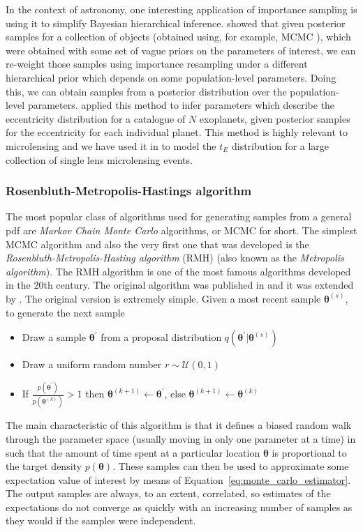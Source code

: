 \documentclass[12pt,dvipsnames]{report}
\renewcommand{\vec}[1]{\boldsymbol{\mathbf{#1}}}
\begin{document}
In the context of astronomy, one  interesting 
application of importance sampling is using it to simplify Bayesian hierarchical 
inference. \citet{2010ApJ...725.2166H} showed that given posterior samples for a 
collection of objects (obtained using, for example, MCMC ), which were obtained with some 
set of vague priors on the parameters of interest, we can re-weight those samples using 
importance resampling under a different hierarchical prior which depends on some 
population-level parameters. Doing this, we can obtain samples from a posterior 
distribution over the population-level parameters. 
\citet{2010ApJ...725.2166H} applied this method to infer parameters which 
describe the eccentricity  distribution for a catalogue of $N$ exoplanets, given 
posterior samples for the eccentricity for each individual planet. 
This method is highly relevant to microlensing and we have used it in \citet{golovich2022}
to model the $t_E$ distribution for a large collection of single lens microlensing 
events. 

\subsubsection{Rosenbluth-Metropolis-Hastings algorithm}
The most popular class of algorithms used for generating samples 
from a general pdf are 
\emph{Markov Chain Monte Carlo} algorithms, or MCMC for short. The simplest 
MCMC algorithm and also the very first one that was developed is the
\emph{Rosenbluth-Metropolis-Hasting algorithm} (RMH) (also known as the 
\emph{Metropolis algorithm}). The RMH algorithm is one of 
the most famous algorithms developed in the 20th century. The original algorithm was 
published in \citet{1953JChPh..21.1087M} and it was extended by 
\citet{1970Bimka..57...97H}. The original version is extremely simple. 
Given a most recent sample $\vec\theta^{(s)}$, to generate the next sample
\begin{itemize}
    \item Draw a sample $\vec{\theta}^\prime$ from a proposal distribution $q(\bm\theta^\prime\lvert\vec\theta^{(s)})$ 
    \item Draw a uniform random number $r\sim\mathcal{U}(0,1)$
    \item If $\frac{p(\bm\theta^\prime)}{p(\vec\theta^{(k)})}>1$ then $\bm\theta^{(k+1)}\leftarrow \bm\theta^\prime$, else $\bm\theta^{(k+1)}\leftarrow\bm\theta^{(k)}$
\end{itemize}
The main characteristic of this algorithm is that it defines a biased random walk
through the parameter space (usually moving in only one parameter at a time) 
in such that the amount of time spent at a particular location $\vec\theta$ is 
proportional to the target density $p(\vec\theta)$.
These samples can then be used to approximate some expectation value of interest 
by means of Equation~\ref{eq:monte_carlo_estimator}. The output samples are always, 
to an extent, correlated, so estimates of the expectations do not converge as 
quickly with an increasing number of samples as they would if the samples were independent.
\end{document}
